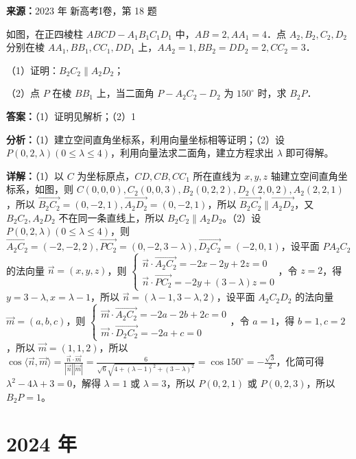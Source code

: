 \begin{question}[points=12]
\textbf{来源：}2023 年 新高考I卷，第 18 题\par
如图，在正四棱柱 $ABCD-A_1B_1C_1D_1$ 中，$AB=2, AA_1=4$．点 $A_2, B_2, C_2, D_2$ 分别在棱 $AA_1, BB_1, CC_1, DD_1$ 上，$AA_2=1, BB_2=DD_2=2, CC_2=3$．



（1）证明：$B_2C_2\parallel A_2D_2$；

（2）点 $P$ 在棱 $BB_1$ 上，当二面角 $P-A_2C_2-D_2$ 为 $150^\circ$ 时，求 $B_2P$．
\begin{solution}
\textbf{答案：}（1）证明见解析；（2）1

\textbf{分析：}（1）建立空间直角坐标系，利用向量坐标相等证明；（2）设 $P(0,2,\lambda)(0\leq\lambda\leq4)$，利用向量法求二面角，建立方程求出 $\lambda$ 即可得解。

\textbf{详解：}（1）以 $C$ 为坐标原点，$CD, CB, CC_1$ 所在直线为 $x, y, z$ 轴建立空间直角坐标系，如图，则 $C(0,0,0), C_2(0,0,3), B_2(0,2,2), D_2(2,0,2), A_2(2,2,1)$，所以 $\overrightarrow{B_2C_2}=(0,-2,1), \overrightarrow{A_2D_2}=(0,-2,1)$，所以 $\overrightarrow{B_2C_2}\parallel\overrightarrow{A_2D_2}$，又 $B_2C_2, A_2D_2$ 不在同一条直线上，所以 $B_2C_2\parallel A_2D_2$。（2）设 $P(0,2,\lambda)(0\leq\lambda\leq4)$，则 $\overrightarrow{A_2C_2}=(-2,-2,2), \overrightarrow{PC_2}=(0,-2,3-\lambda), \overrightarrow{D_2C_2}=(-2,0,1)$，设平面 $PA_2C_2$ 的法向量 $\vec{n}=(x,y,z)$，则 $\begin{cases} \vec{n}\cdot\overrightarrow{A_2C_2}=-2x-2y+2z=0 \\ \vec{n}\cdot\overrightarrow{PC_2}=-2y+(3-\lambda)z=0 \end{cases}$，令 $z=2$，得 $y=3-\lambda, x=\lambda-1$，所以 $\vec{n}=(\lambda-1,3-\lambda,2)$，设平面 $A_2C_2D_2$ 的法向量 $\vec{m}=(a,b,c)$，则 $\begin{cases} \vec{m}\cdot\overrightarrow{A_2C_2}=-2a-2b+2c=0 \\ \vec{m}\cdot\overrightarrow{D_2C_2}=-2a+c=0 \end{cases}$，令 $a=1$，得 $b=1, c=2$，所以 $\vec{m}=(1,1,2)$，所以 $\cos\langle\vec{n},\vec{m}\rangle=\frac{\vec{n}\cdot\vec{m}}{|\vec{n}||\vec{m}|}=\frac{6}{\sqrt{6}\sqrt{4+(\lambda-1)^2+(3-\lambda)^2}}=\cos150^\circ=-\frac{\sqrt{3}}{2}$，化简可得 $\lambda^2-4\lambda+3=0$，解得 $\lambda=1$ 或 $\lambda=3$，所以 $P(0,2,1)$ 或 $P(0,2,3)$，所以 $B_2P=1$。
\end{solution}
\end{question}

\section*{2024 年}


